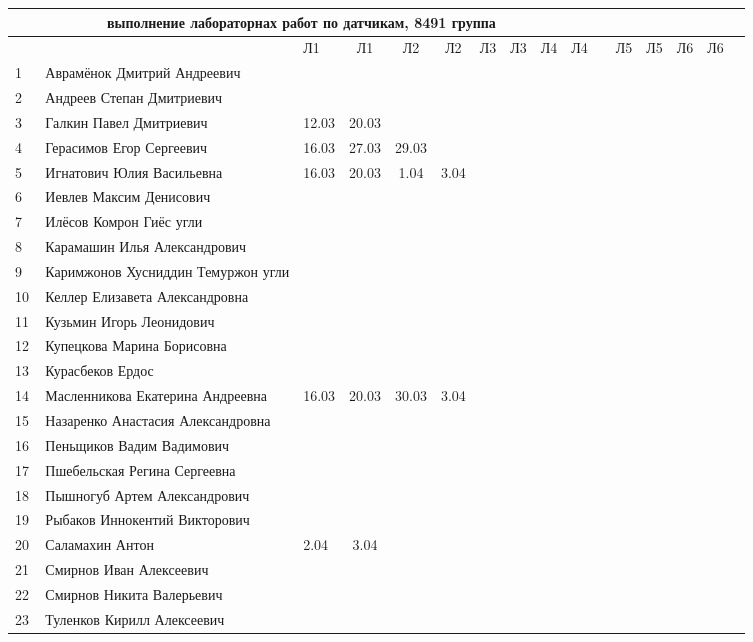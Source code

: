 \documentclass[a4paper,landscape,11pt]{article}
\begin{document}
\newpage
%
\begin{tabular}{l|llccccccccccccc}
\multicolumn{10}{c}{выполнение лабораторнах работ по датчикам, 8491 группа} \\
\toprule
&&Л1&Л1& Л2&Л2& Л3&Л3& Л4&Л4& &Л5&Л5& Л6&Л6\\
\midrule
1\,&   Аврамёнок Дмитрий Андреевич        &&&&&&&&\\
2\,&   Андреев Степан Дмитриевич          &&&&&&&&\\
3\,&   Галкин Павел Дмитриевич            & 12.03& 20.03&&&&&&\\
4\,&   Герасимов Егор Сергеевич           & 16.03& 27.03& 29.03& &&&&\\
5\,&   Игнатович Юлия Васильевна          & 16.03& 20.03& 1.04& 3.04&&&&\\
\midrule
6\,&   Иевлев Максим Денисович            &&&&&&&&\\
7\,&   Илёсов Комрон Гиёс угли            &&&&&&&&\\
8\,&   Карамашин Илья Александрович       &&&&&&&&\\
9\,&   Каримжонов Хусниддин Темуржон угли &&&&&&&&\\
10\,&  Келлер Елизавета Александровна     &&&&&&&&\\
\midrule
11\,&  Кузьмин Игорь Леонидович           &&&&&&&&\\
12\,&  Купецкова Марина Борисовна         &&&&&&&&\\
13\,&  Курасбеков Ердос                   &&&&&&&&\\
14\,&  Масленникова Екатерина Андреевна   & 16.03& 20.03&30.03& 3.04&&&&\\
15\,&  Назаренко Анастасия Александровна  &&&&&&&&\\
\midrule
16\,&  Пеньщиков Вадим Вадимович          &&&&&&&&\\
17\,&  Пшебельская Регина Сергеевна       &&&&&&&&\\
18\,&  Пышногуб Артем Александрович       &&&&&&&&\\
19\,&  Рыбаков Иннокентий Викторович      &&&&&&&&\\
20\,&  Саламахин Антон                    & 2.04& 3.04&&&&&&\\
\midrule
21\,&  Смирнов Иван Алексеевич            &&&&&&&&\\
22\,&  Смирнов Никита Валерьевич          &&&&&&&&\\
23\,&  Туленков Кирилл Алексеевич         &&&&&&&&\\
\bottomrule
\end{tabular}
\end{document}
